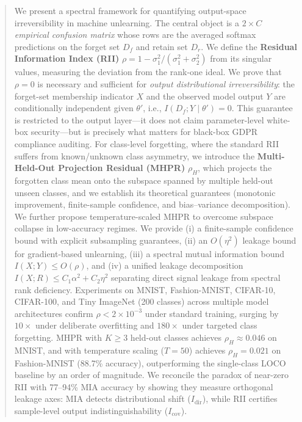 \documentclass[journal]{IEEEtran}
\theoremstyle{definition}
\begin{document}
\begin{abstract}
We present a spectral framework for quantifying output-space irreversibility in machine unlearning. The central object is a $2\times C$ \emph{empirical confusion matrix} whose rows are the averaged softmax predictions on the forget set $D_f$ and retain set $D_r$. We define the \textbf{Residual Information Index (RII)} $\rho = 1 - \sigma_1^2/(\sigma_1^2+\sigma_2^2)$ from its singular values, measuring the deviation from the rank-one ideal. We prove that $\rho=0$ is necessary and sufficient for \emph{output distributional irreversibility}: the forget-set membership indicator $X$ and the observed model output $Y$ are conditionally independent given $\theta'$, i.e., $I(D_f; Y \mid \theta') = 0$. This guarantee is restricted to the output layer---it does not claim parameter-level white-box security---but is precisely what matters for black-box GDPR compliance auditing. For class-level forgetting, where the standard RII suffers from known/unknown class asymmetry, we introduce the \textbf{Multi-Held-Out Projection Residual (MHPR)} $\rho_H$, which projects the forgotten class mean onto the subspace spanned by multiple held-out unseen classes, and we establish its theoretical guarantees (monotonic improvement, finite-sample confidence, and bias--variance decomposition). We further propose temperature-scaled MHPR to overcome subspace collapse in low-accuracy regimes. We provide (i) a finite-sample confidence bound with explicit subsampling guarantees, (ii) an $O(\eta^2)$ leakage bound for gradient-based unlearning, (iii) a spectral mutual information bound $I(X;Y) \le O(\rho)$, and (iv) a unified leakage decomposition $I(X;R) \le C_1\alpha^2 + C_2\eta^2$ separating direct signal leakage from spectral rank deficiency. Experiments on MNIST, Fashion-MNIST, CIFAR-10, CIFAR-100, and Tiny ImageNet (200 classes) across multiple model architectures confirm $\rho < 2 \times 10^{-3}$ under standard training, surging by $10\times$ under deliberate overfitting and $180\times$ under targeted class forgetting. MHPR with $K\ge 3$ held-out classes achieves $\rho_H \approx 0.046$ on MNIST, and with temperature scaling ($T=50$) achieves $\rho_H=0.021$ on Fashion-MNIST (88.7\% accuracy), outperforming the single-class LOCO baseline by an order of magnitude. We reconcile the paradox of near-zero RII with 77--94\% MIA accuracy by showing they measure orthogonal leakage axes: MIA detects distributional shift ($I_{\mathrm{dir}}$), while RII certifies sample-level output indistinguishability ($I_{\mathrm{cov}}$).
\end{abstract}
\end{document}
